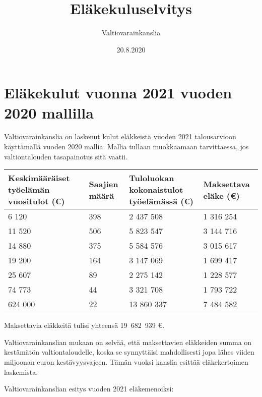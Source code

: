 \documentclass{article}
\title{Eläkekuluselvitys}
\author{Valtiovarainkanslia}
\date{20.8.2020}
\begin{document}
	
	\maketitle
	
	\newpage
	\section{Eläkekulut vuonna 2021 vuoden 2020 mallilla}
	
	Valtiovarainkanslia on laskenut kulut eläkkeistä vuoden 2021 talousarvioon käyttämällä vuoden 2020 mallia. Mallia tullaan muokkaamaan tarvittaessa, jos valtiontalouden tasapainotus sitä vaatii.
	
	\vspace{12pt}
	
	\begin{table}[htbp]
	\centering
	\begin{tabularx}{\textwidth}{|X|X|X|X|}
		\hline
		Keskimääräiset työelämän vuositulot (€) & Saajien määrä & Tuloluokan kokonaistulot työelämässä (€) & Maksettava eläke (€)\\
		\hline
		6 120 & 398 & 2 437 508 & 1 316 254\\
		\hline
		11 520 & 506 & 5 823 547 & 3 144 716\\
		\hline
		14 880 & 375 & 5 584 576 & 3 015 617\\
		\hline
		19 200 & 164 & 3 147 069 & 1 699 417\\
		\hline
		25 607 & 89 & 2 275 142 & 1 228 577\\
		\hline
		74 773 & 44 & 3 321 708 & 1 793 722\\
		\hline
		624 000 & 22 & 13 860 337 & 7 484 582\\
		\hline
	\end{tabularx}
	\end{table}

	\vspace{12pt}
	
	Maksettavia eläkkeitä tulisi yhteensä 19 682 939 €.
	
	\vspace{12pt}
	Valtiovarainkanslian mukaan on selvää, että maksettavien eläkkeiden summa on kestämätön valtiontaloudelle, koska se synnyttäisi mahdollisesti jopa lähes viiden miljoonan euron kestävyysvajeen. Tämän vuoksi kanslia esittää eläkekertoimen laskemista.
	
	\vspace{12pt}
	Valtiovarainkanslian esitys vuoden 2021 eläkemenoiksi:
	
\end{document}

